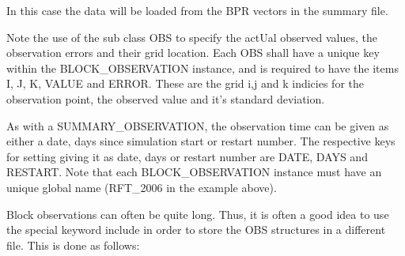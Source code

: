 \documentclass[letterpaper,10pt,english]{sphinxmanual}
\begin{document}
%
\begin{sphinxVerbatim}[commandchars=\\\{\}]
 
     
      
     

                          
                          
                          
\end{sphinxVerbatim}

In this case the data will be loaded from the BPR vectors in the
summary file.

Note the use of the sub class OBS to specify the actUal observed
values, the observation errors and their grid location. Each OBS shall
have a unique key within the BLOCK\_OBSERVATION instance, and is
required to have the items I, J, K, VALUE and ERROR. These are the
grid i,j and k indicies for the observation point, the observed value
and it’s standard deviation.

As with a SUMMARY\_OBSERVATION, the observation time can be given as
either a date, days since simulation start or restart number. The
respective keys for setting giving it as date, days or restart number
are DATE, DAYS and RESTART. Note that each BLOCK\_OBSERVATION instance
must have an unique global name (RFT\_2006 in the example above).

Block observations can often be quite long. Thus, it is often a good
idea to use the special keyword include in order to store the OBS
structures in a different file. This is done as follows:
\end{document}
